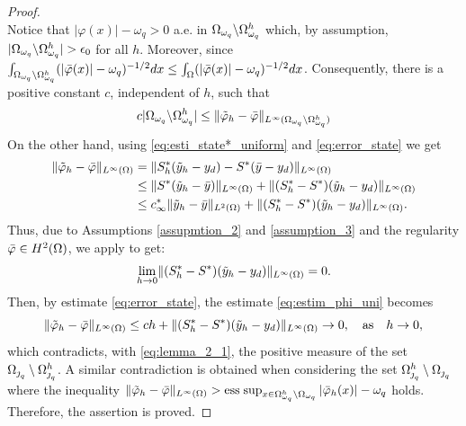{\begin{proof}
\begin{equation}
\end{equation}
Notice that $|\varphi(x)|-\omega_q>0$ a.e. in $\Omega_{\omega_q} \backslash \Omega^h_{\omega_q}$ which, by assumption, $|\om_{\omega_q} \backslash \om^h_{\omega_q}|> \epsilon_0$ for all $h$. Moreover, since $\int_{\Omega_{\omega_q} \backslash \Omega^h_{\omega_q}} (|\bar\varphi(x)| -\omega_q) ^{-1/2}dx  \leq  \int_{\Omega} (|\bar\varphi(x)| -\omega_q )^{-1/2}dx $.
%
Consequently, there is a positive constant $c$, independent of $h$, such that
 \begin{equation}\label{eq:lemma_1_1}
  c |\Omega_{\omega_q} \backslash \Omega^h_{\omega_q}| \leq  \|\tilde\varphi_h-\bar\varphi\|_{L^{\infty}(\Omega_{\omega_q} \backslash \Omega^h_{\omega_q})}
 \end{equation}
 On the other hand, using \eqref{eq:esti_state*_uniform} and \eqref{eq:error_state} we get
 \begin{align}
     \lVert \tilde\varphi_h-\bar\varphi \rVert_{L^{\infty}(\Omega)}&=\lVert S_h^*(\tilde y_h-y_d)-S^*(\bar y - y_d) \rVert_{L^{\infty}(\Omega)} \nonumber \\
     &\le\lVert S^*  (\tilde y_h-\bar y) \rVert_{L^{\infty}(\Omega)}+\lVert (S^*_h-S^*)(\tilde y_h-y_d) \rVert_{L^{\infty}(\Omega)} \nonumber\\
     & \le c_\infty^*\lVert \tilde y_h-\bar y \rVert_{L^2(\Omega)}+  \lVert (S^*_h-S^*)(\tilde y_h-y_d) \rVert_{L^{\infty}(\Omega)}. \label{eq:estim_phi_uni}
 \end{align}
Thus, due to Assumptions \ref{assupmtion_2}  and \ref{assumption_3}  and the regularity $\bar\varphi \in H^2(\Omega)$, we apply \cite[Theorem 19.3]{ciarlet1990} to get:
 \[
 \lim_{h\to 0}\lVert (S^*_h-S^*)(\tilde y_h-y_d) \rVert_{L^{\infty}(\Omega)}=0.
 \]
Then, by estimate \eqref{eq:error_state},  the estimate \eqref{eq:estim_phi_uni} becomes
\begin{equation}\label{eq:adjstate_conv}
      \lVert \tilde\varphi_h-\bar\varphi \rVert_{L^{\infty}(\Omega)} \leq c h + \lVert (S^*_h-S^*)(\tilde y_h-y_d) \rVert_{L^{\infty}(\Omega)}  \to 0, \quad \text{as} \quad h\to 0,
\end{equation}
which contradicts, with \eqref{eq:lemma_2_1}, the positive measure of the set $\Omega_{\operatorname{\jmath}_q}\setminus \Omega_{\operatorname{\jmath}_q}^h$. A similar contradiction is obtained when considering the set $ \Omega^h_{\operatorname{\jmath}_q}\setminus \Omega_{\operatorname{\jmath}_q} $ where the inequality $\lVert \tilde\varphi_h-\bar\varphi \rVert_{L^{\infty}(\Omega)}> \operatorname*{ess\;sup}_{x\in\Omega^h_{\omega_q}\setminus\Omega_{\omega_q}}|\bar\varphi_{h}(x)|-\omega_q$ holds. Therefore, the assertion is proved.
\end{proof}

}
